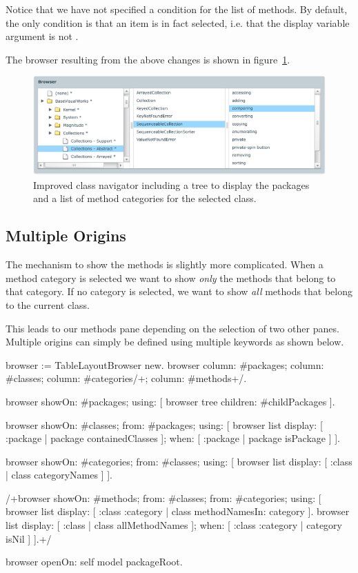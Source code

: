 \documentclass[a4paper,10pt,twoside]{book}
\begin{document}
Notice that we have not specified a  condition for the list of methods. By default, the only condition is that an item is in fact selected, i.e. that the display variable argument is not .

The browser resulting from the above changes is shown in figure~\ref{fig:treeandcategories}.

\begin{figure}[htbp]
\centerline{\includegraphics[width=\linewidth]{treeandcategories.pdf}}
\caption{	Improved class navigator including a tree to display the packages and a list of method categories for the selected class.}
\label{fig:treeandcategories}
\end{figure}



\subsection{Multiple Origins}

The mechanism to show the methods is slightly more complicated. When a method category is selected we want to show \emph{only} the methods that belong to that category. If no category is selected, we want to show \emph{all} methods that belong to the current class.

This leads to our methods pane depending on the selection of two other panes. Multiple origins can simply be defined using multiple  keywords as shown below.

\begin{code}{}
browser := TableLayoutBrowser new.
browser
	column: #packages;
	column: #classes;
	column: #categories/+;
	column: #methods+/.

browser showOn: #packages; using: [
	browser tree
		children: #childPackages
].

browser showOn: #classes; from: #packages; using: [
	browser list
		display: [ :package | package containedClasses ];
		when: [ :package | package isPackage ]
].

browser showOn: #categories; from: #classes; using: [
	browser list
		display: [ :class | class categoryNames ]
].

/+browser showOn: #methods; from: #classes; from: #categories; using: [
	browser list
		display: [ :class :category | class methodNamesIn: category ].
	browser list
		display: [ :class | class allMethodNames ];
		when: [ :class :category | category isNil ]
].+/

browser openOn: self model packageRoot.
\end{code}
\end{document}
